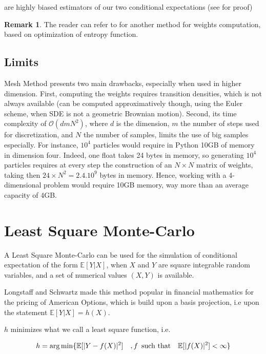 \documentclass[english,11pt,openany]{report}
\theoremstyle{definition}
\newcommand{\bigO}{\mathcal{O}}
\theoremstyle{plain}
\theoremstyle{definition}
\newtheorem{Rem}[Th]{Remark}
\begin{document}
are highly biased estimators of our two conditional expectations (see \cite{glasserman:broadie} for proof)


\begin{Rem}
	The reader can refer to \cite{glasserman:amoption} for another method for weights computation, based on optimization of entropy function. 
\end{Rem}

\subsection{Limits}


Mesh Method presents two main drawbacks, especially when used in higher dimension. 
First, computing the weights requires transition densities, which is not always available (can be computed approximatively though, using the Euler scheme, when SDE is not a geometric Brownian motion). 
Second, its time complexity of $\bigO(dmN^2)$, where $d$ is the dimension, $m$ the number of steps used for discretization, and $N$ the number of samples, limits the use of big samples especially. 
For instance, $10^4$ particles would require in Python 10GB of memory in dimension four. Indeed, one float takes 24 bytes in memory, so generating $10^4$ particles requires at every step the construction of an $N\times N$ matrix of weights, taking then $24\times N^2 = 2.4.10^9$ bytes in memory. Hence, working with a 4-dimensional problem would require 10GB memory, way more than an average capacity of 4GB. 

\section{Least Square Monte-Carlo}

A Least Square Monte-Carlo can be used for the simulation of conditional expectation of the form $\mathbb{E}[Y|X]$, when $X$ and $Y$ are square integrable random variables, and a set of numerical values $(X,Y)$ is available. 

Longstaff and Schwartz made this method popular in financial mathematics for the pricing of American Options, which is build upon a basis projection, i.e upon the statement $\mathbb{E}[Y|X] = h(X)$. 

$h$ minimizes what we call a least square function, i.e. 

\begin{equation}
h = \arg \min\{\mathbb{E}[|Y - f(X)|^2] \quad,  f \enskip \text{such that} \quad \mathbb{E}[|f(X)|^2]<\infty\}
\end{equation}
\end{document}
